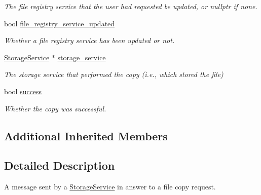 \begin{DoxyCompactItemize}
\begin{DoxyCompactList}\small\item\em The file registry service that the user had requested be updated, or nullptr if none. \end{DoxyCompactList}\item 
\mbox{\label{classwrench_1_1_storage_service_file_copy_answer_message_af024699e47c097438ec0425b1ec233a7}} 
bool \hyperlink{classwrench_1_1_storage_service_file_copy_answer_message_af024699e47c097438ec0425b1ec233a7}{file\+\_\+registry\+\_\+service\+\_\+updated}
\begin{DoxyCompactList}\small\item\em Whether a file registry service has been updated or not. \end{DoxyCompactList}\item 
\mbox{\label{classwrench_1_1_storage_service_file_copy_answer_message_aee16bb6721a2cca2bd17660eb69c5ede}} 
\hyperlink{classwrench_1_1_storage_service}{Storage\+Service} $\ast$ \hyperlink{classwrench_1_1_storage_service_file_copy_answer_message_aee16bb6721a2cca2bd17660eb69c5ede}{storage\+\_\+service}
\begin{DoxyCompactList}\small\item\em The storage service that performed the copy (i.\+e., which stored the file) \end{DoxyCompactList}\item 
\mbox{\label{classwrench_1_1_storage_service_file_copy_answer_message_a30bcbbab083b6517691515877b97633b}} 
bool \hyperlink{classwrench_1_1_storage_service_file_copy_answer_message_a30bcbbab083b6517691515877b97633b}{success}
\begin{DoxyCompactList}\small\item\em Whether the copy was successful. \end{DoxyCompactList}\end{DoxyCompactItemize}
\subsection*{Additional Inherited Members}


\subsection{Detailed Description}
A message sent by a \hyperlink{classwrench_1_1_storage_service}{Storage\+Service} in answer to a file copy request. 

